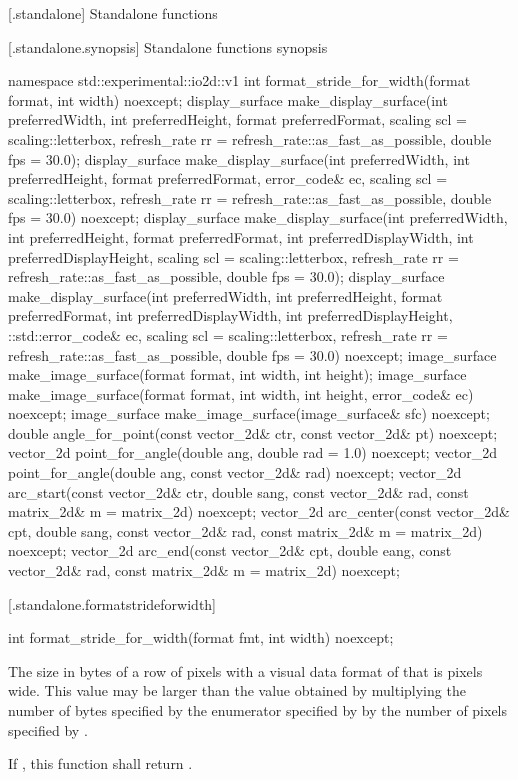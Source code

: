  [\iotwod.standalone] {Standalone functions}

 [\iotwod.standalone.synopsis] {Standalone functions synopsis}

\begin{codeblock}
namespace std::experimental::io2d::v1 {
  int format_stride_for_width(format format, int width) noexcept;
  display_surface make_display_surface(int preferredWidth,
    int preferredHeight, format preferredFormat,
    scaling scl = scaling::letterbox,
    refresh_rate rr = refresh_rate::as_fast_as_possible, double fps = 30.0);
  display_surface make_display_surface(int preferredWidth,
    int preferredHeight, format preferredFormat, error_code& ec,
    scaling scl = scaling::letterbox,
    refresh_rate rr = refresh_rate::as_fast_as_possible, double fps = 30.0) noexcept;
  display_surface make_display_surface(int preferredWidth,
    int preferredHeight, format preferredFormat, int preferredDisplayWidth, 
    int preferredDisplayHeight, scaling scl = scaling::letterbox,
    refresh_rate rr = refresh_rate::as_fast_as_possible, double fps = 30.0);
  display_surface make_display_surface(int preferredWidth,
    int preferredHeight, format preferredFormat, int preferredDisplayWidth, 
    int preferredDisplayHeight, ::std::error_code& ec,
    scaling scl = scaling::letterbox,
    refresh_rate rr = refresh_rate::as_fast_as_possible, double fps = 30.0) noexcept;
  image_surface make_image_surface(format format, int width, int height);
  image_surface make_image_surface(format format, int width, int height, 
    error_code& ec) noexcept;
  image_surface make_image_surface(image_surface& sfc) noexcept;
  double angle_for_point(const vector_2d& ctr, const vector_2d& pt) noexcept;
  vector_2d point_for_angle(double ang, double rad = 1.0) noexcept;
  vector_2d point_for_angle(double ang, const vector_2d& rad) noexcept;
  vector_2d arc_start(const vector_2d& ctr, double sang, const vector_2d& rad, 
    const matrix_2d& m = matrix_2d{}) noexcept;
  vector_2d arc_center(const vector_2d& cpt, double sang, const vector_2d& rad, 
    const matrix_2d& m = matrix_2d{}) noexcept;
  vector_2d arc_end(const vector_2d& cpt, double eang, const vector_2d& rad, 
    const matrix_2d& m = matrix_2d{}) noexcept;
}
\end{codeblock}

 [\iotwod.standalone.formatstrideforwidth] {}

%
\begin{itemdecl}
int format_stride_for_width(format fmt, int width) noexcept;
\end{itemdecl}
\begin{itemdescr}
\pnum
\returns
The size in bytes of a row of pixels with a visual data format of  that is  pixels wide. This value may be larger than the value obtained by multiplying the number of bytes specified by the  enumerator specified by  by the number of pixels specified by .

\pnum
If , this function shall return .
\end{itemdescr}

